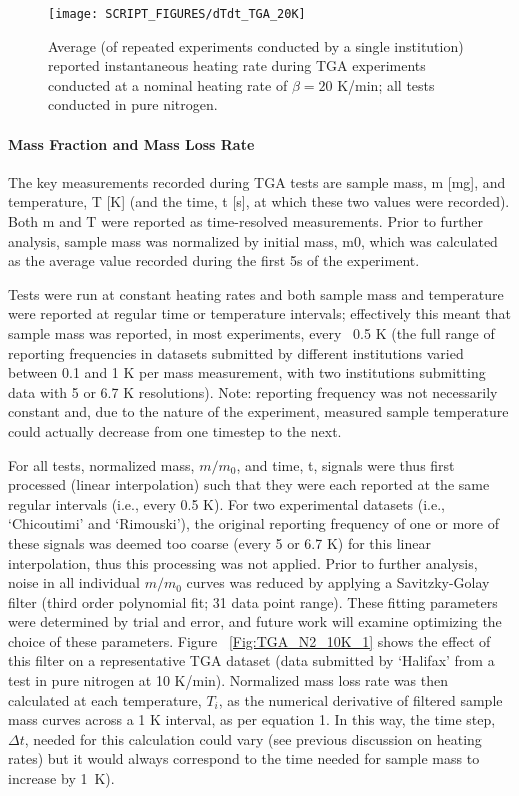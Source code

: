 \documentclass{book}
\begin{document}
\begin{figure}
  \centering
  \texttt{[image: SCRIPT\_FIGURES/dTdt\_TGA\_20K]}
  \caption{Average (of repeated experiments conducted by a single institution) reported instantaneous heating rate during TGA experiments conducted at a nominal heating rate of $\beta=20$ K/min; all tests conducted in pure nitrogen.}
  \label{Fig:dTdt_TGA_20K}
\end{figure}


\paragraph{Mass Fraction and Mass Loss Rate}

The key measurements recorded during TGA tests are sample mass, m [mg], and temperature, T [K] (and the time, t [s], at which these two values were recorded).  Both m and T were reported as time-resolved measurements. Prior to further analysis, sample mass was normalized by initial mass, m0, which was calculated as the average value recorded during the first 5s of the experiment.

Tests were run at constant heating rates and both sample mass and temperature were reported at regular time or temperature intervals; effectively this meant that sample mass was reported, in most experiments, every ~0.5 K (the full range of reporting frequencies in datasets submitted by different institutions varied between 0.1 and 1 K per mass measurement, with two institutions submitting data with 5 or 6.7 K resolutions). Note: reporting frequency was not necessarily constant and, due to the nature of the experiment, measured sample temperature could actually decrease from one timestep to the next.

For all tests, normalized mass, $m/m_0$, and time, t, signals were thus first processed (linear interpolation) such that they were each reported at the same regular intervals (i.e., every 0.5 K). For two experimental datasets (i.e., ‘Chicoutimi’ and ‘Rimouski’), the original reporting frequency of one or more of these signals was deemed too coarse (every 5 or 6.7 K) for this linear interpolation, thus this processing was not applied.
Prior to further analysis, noise in all individual $m/m_0$ curves was reduced by applying a Savitzky-Golay filter (third order polynomial fit; 31 data point range). These fitting parameters were determined by trial and error, and future work will examine optimizing the choice of these parameters. Figure ~\ref{Fig:TGA_N2_10K_1} shows the effect of this filter on a representative TGA dataset (data submitted by ‘Halifax’ from a test in pure nitrogen at 10 K/min).
Normalized mass loss rate was then calculated at each temperature, $T_i$, as the numerical derivative of filtered sample mass curves across a 1 K interval, as per equation 1. In this way, the time step, $\Delta t$, needed for this calculation could vary (see previous discussion on heating rates) but it would always correspond to the time needed for sample mass to increase by 1~K).
\end{document}
